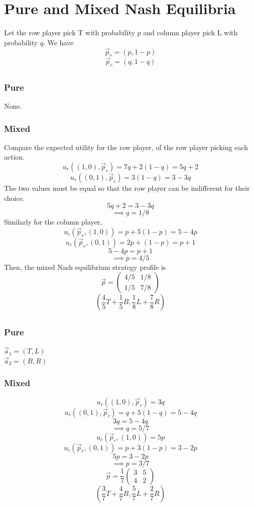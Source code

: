 \section{Pure and Mixed Nash Equilibria}
Let the row player pick T with probability $p$ and column player pick L with probability $q$.
We have 
\[\vec{p}_r=(p,1-p)\]
\[\vec{p}_c=(q,1-q)\]
\subsection{}



\subsubsection{Pure}
None.
\subsubsection{Mixed}
Compare the expected utility for the row player, 
of the row player picking each action.
\[u_r((1,0),\vec{p}_c)=7q+2(1-q)=5q+2\]
\[u_r((0,1),\vec{p}_c)=3(1-q)=3-3q\]
The two values must be equal so that the row player can be indifferent for their choice.
\[5q+2=3-3q\]
\[\implies q=1/8\]
Similarly for the column player,
\[u_c(\vec{p}_r, (1,0))=p+5(1-p)=5-4p\]
\[u_c(\vec{p}_r, (0,1))=2p+(1-p)=p+1\]
\[5-4p=p+1\]
\[\implies p=4/5\]
Then, the mixed Nash equilibrium strategy profile is
\[\vec{p}=\begin{pmatrix}
    4/5 & 1/8\\
    1/5 & 7/8
\end{pmatrix}\]
\[\left(\frac{4}{5}T+\frac{1}{5}B,\frac{1}{8}L+\frac{7}{8}R\right)\]

\subsection{}
\subsubsection{Pure}
$\vec{a}_1=(T,L)$\\
$\vec{a}_2=(B,R)$
\subsubsection{Mixed}
\[u_r((1,0),\vec{p}_c)=3q\]
\[u_r((0,1),\vec{p}_c)=q+5(1-q)=5-4q\]
\[3q=5-4q\]
\[\implies q=5/7\]
\[u_c(\vec{p}_r, (1,0))=5p\]
\[u_c(\vec{p}_r, (0,1))=p+3(1-p)=3-2p\]
\[5p=3-2p\]
\[\implies p=3/7\]
\[\vec{p}=\frac{1}{7}
\begin{pmatrix}
    3 & 5\\
    4 & 2
\end{pmatrix}\]
\[\left(\frac{3}{7}T+\frac{4}{7}B,\frac{5}{7}L+\frac{2}{7}R\right)\]


